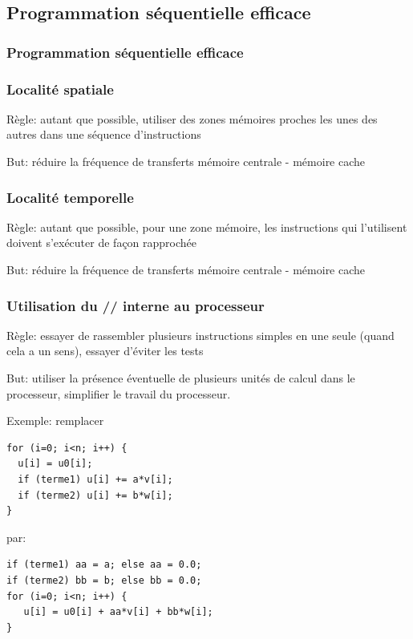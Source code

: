 \documentclass{beamer}
\begin{document}
\begin{frame}
\section{Programmation s\'equentielle efficace}
\frametitle{Programmation s\'equentielle efficace}
\end{frame}

\begin{frame}
\frametitle{Localit\'e spatiale}
Règle: autant que possible, utiliser des zones m\'emoires proches les unes des autres dans une s\'equence d'instructions

\bigskip
But: r\'eduire la fr\'equence de transferts m\'emoire centrale - m\'emoire cache
\end{frame}

\begin{frame}
\frametitle{Localit\'e temporelle}
Règle: autant que possible, pour une zone m\'emoire, les instructions qui l'utilisent doivent s'ex\'ecuter de façon rapproch\'ee

\bigskip
But: r\'eduire la fr\'equence de transferts m\'emoire centrale - m\'emoire cache
\end{frame}

\begin{frame}[fragile]
\frametitle{Utilisation du // interne au processeur}
Règle: essayer de rassembler plusieurs instructions simples en une seule (quand cela a un sens), essayer d'\'eviter les tests

\bigskip
But: utiliser la pr\'esence \'eventuelle de plusieurs unit\'es de calcul dans le processeur, simplifier le travail du processeur.

\end{frame}

\begin{frame}[fragile]
Exemple: remplacer
\begin{lstlisting}
for (i=0; i<n; i++) {
  u[i] = u0[i];
  if (terme1) u[i] += a*v[i];
  if (terme2) u[i] += b*w[i];
}
\end{lstlisting}

par:
\begin{lstlisting}
if (terme1) aa = a; else aa = 0.0;
if (terme2) bb = b; else bb = 0.0;
for (i=0; i<n; i++) {
   u[i] = u0[i] + aa*v[i] + bb*w[i];
}
\end{lstlisting}

\end{frame}
\end{document}
